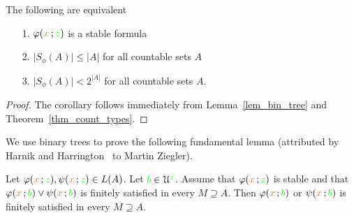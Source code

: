 \begin{corollary}\label{corol_count_types}
The following are equivalent
\begin{itemize}
\item[1.] $\varphi({\color{brown} x}\,;{\color{green} z})$ is a stable formula
\item[2.] $\big|S_{\phi}(A)\big|\le|A|$ for all countable sets $A$
\item[3.] $\big|S_{\phi}(A)\big|<2^{|A|}$ for all countable sets $A$.
\end{itemize}
\end{corollary}

\begin{proof}
  The corollary follows immediately from Lemma~\ref{lem_bin_tree} and Theorem~\ref{thm_count_types}.
\end{proof}

We use binary trees to prove the following fundamental lemma (attributed by Harnik and Harrington~\cite{HH} to Martin Ziegler).

\begin{lemma}\label{lem_ziegler}
   Let $\varphi({\color{brown} x}\,;{\color{green} z}),\psi({\color{brown} x}\,;{\color{green} z}) \in L(A)$.
   Let ${\color{green} b}\in\EuScript U^{\color{green} z}$.
   Assume that $\varphi({\color{brown} x}\,;{\color{green} z})$ is stable and that $\varphi({\color{brown} x}\,;{\color{green} b})\vee\psi({\color{brown} x}\,;{\color{green} b})$ is finitely satisfied in every $M\supseteq A$.
   Then $\varphi({\color{brown} x}\,;{\color{green} b})$ or $\psi({\color{brown} x}\,;{\color{green} b})$ is finitely satisfied in every $M\supseteq A$.
\end{lemma} 

